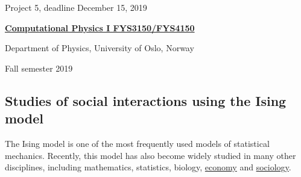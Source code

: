 \documentclass[%
oneside,                 %
final,                   %
10pt]{article}
\begin{document}

\newcommand{\exercisesection}[1]{\subsection*{#1}}






\thispagestyle{empty}

\begin{center}
{\LARGE\bf
\begin{spacing}{1.25}
Project 5, deadline  December 15, 2019
\end{spacing}
}
\end{center}


\begin{center}
{\bf \href{{http://www.uio.no/studier/emner/matnat/fys/FYS3150/index-eng.html}}{Computational Physics I FYS3150/FYS4150}}
\end{center}

    \begin{center}
\centerline{{\small Department of Physics, University of Oslo, Norway}}
\end{center}
    

\begin{center}
Fall semester 2019
\end{center}

\vspace{1cm}


\subsection{Studies of social interactions using the Ising model}

The Ising model is one of the most
frequently used models of statistical mechanics. Recently, this
model has also become widely studied in many other disciplines, including mathematics, statistics, biology, \href{{https://www.springer.com/gp/book/9783319477046}}{economy} and \href{{https://www.springer.com/gp/book/9781461420316}}{sociology}.
\end{document}
